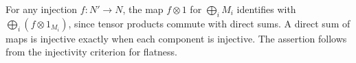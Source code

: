 For any injection $f:N'\to N$, the map $f\otimes1$ for $\bigoplus_iM_i$ identifies with $\bigoplus_i(f\otimes1_{M_i})$, since tensor products commute with direct sums. A direct sum of maps is injective exactly when each component is injective. The assertion follows from the injectivity criterion for flatness.
